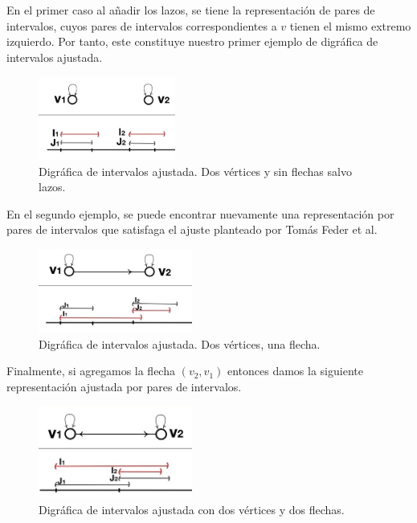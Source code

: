 En el primer caso al añadir los lazos, se tiene la representación de pares de intervalos, cuyos pares de intervalos correspondientes a $v$ tienen el mismo extremo izquierdo. Por tanto, este constituye nuestro primer ejemplo de digráfica de intervalos ajustada.

\begin{figure}[H]
  \centering
  \includegraphics[width=0.4\textwidth]{recursos/capturas/Dgrf_Int_Adj01.jpg}
  \caption{Digráfica de intervalos ajustada. Dos vértices y sin flechas salvo lazos.}
  \label{fig:DgrfAdj01}
\end{figure}

En el segundo ejemplo, se puede encontrar nuevamente una representación por pares de intervalos que satisfaga el ajuste planteado por Tomás Feder et al. 

\begin{figure}[H]
  \centering
  \includegraphics[width=0.45\textwidth]{recursos/capturas/Dgrf_Int_Adj02.jpg}
  \caption{Digráfica de intervalos ajustada. Dos vértices, una flecha.}
  \label{fig:DgrfAdj02}
\end{figure}

Finalmente, si agregamos la flecha $(v_2, v_1)$ entonces damos la siguiente representación ajustada por pares de intervalos. 

\begin{figure}[H]
  \centering
  \includegraphics[width=0.45\textwidth]{recursos/capturas/Dgrf_Int_Adj03.jpg}
  \caption{Digráfica de intervalos ajustada con dos vértices y dos flechas.}
  \label{fig:DgrfAdj03}
\end{figure}

